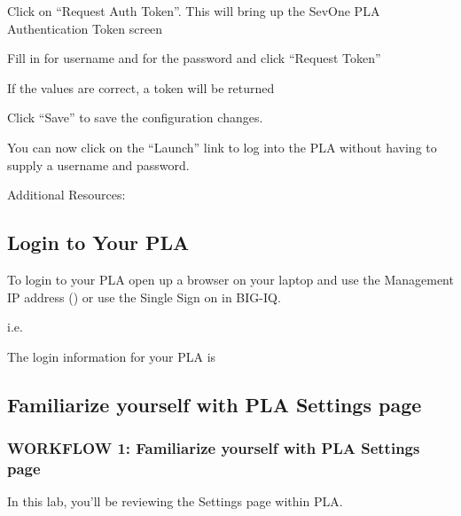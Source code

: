 \documentclass[letterpaper,10pt,english]{sphinxmanual}
\begin{document}

Click on “Request Auth Token”. This will bring up the SevOne PLA
Authentication Token screen


Fill in  for username and  for the password
and click “Request Token”

If the values are correct, a token will be returned


Click “Save” to save the configuration changes.

You can now click on the “Launch” link to log into the PLA without
having to supply a username and password.

Additional Resources:



\subsection{Login to Your PLA}
\label{\detokenize{class1/module6/lab1:login-to-your-pla}}
To login to your PLA open up a browser on your laptop and use the
Management IP address () or use the Single Sign on in
BIG-IQ.

i.e. 

The login information for your PLA is 


\subsection{Familiarize yourself with PLA Settings page}
\label{\detokenize{class1/module6/lab2:familiarize-yourself-with-pla-settings-page}}\label{\detokenize{class1/module6/lab2::doc}}

\subsubsection{WORKFLOW 1: Familiarize yourself with PLA Settings page}
\label{\detokenize{class1/module6/lab2:workflow-1-familiarize-yourself-with-pla-settings-page}}
In this lab, you’ll be reviewing the Settings page within PLA.
\end{document}
